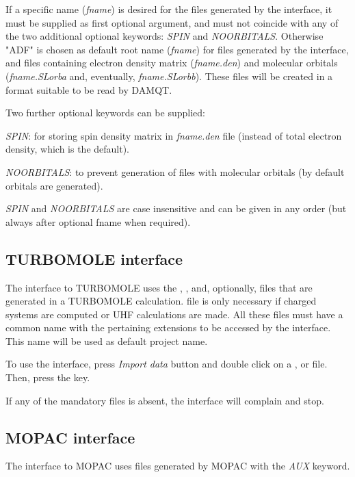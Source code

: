 \documentclass[10pt]{article}
\begin{document}
If a specific name ({\it fname}) is desired for the files generated 
by the interface, it must be supplied 
as first optional argument, and must not coincide 
with any of the two additional optional keywords: {\it SPIN} and {\it NOORBITALS}. Otherwise
"ADF" is chosen as default root name ({\it fname}) 
for files generated by the interface, and files containing electron 
density matrix ({\it fname.den}) and molecular orbitals ({\it fname.SLorba} and, 
eventually, {\it fname.SLorbb}). These files will be created in a format suitable to be 
read by DAMQT.

Two further optional keywords can be supplied:

{\it SPIN}: for storing spin density matrix in {\it fname.den} file (instead of 
total electron density, which is the default).

{\it NOORBITALS}: to prevent generation of files with molecular orbitals (by 
default orbitals are generated).

{\it SPIN} and {\it NOORBITALS} are case insensitive and can be given in any order 
(but always after optional fname when required).

\subsection{TURBOMOLE interface \label{sec:5.4}}

The interface to TURBOMOLE uses the \basis{ }, \mos{ }, \coords{ } and,
optionally, \control{ } files that are generated in a TURBOMOLE calculation.
\control{ } file is only necessary if charged systems are computed or UHF
calculations are made. All these files must have a common name with the pertaining 
extensions to be accessed by the interface. This name will be used as default project name.

To use the interface, press {\it Import data} button \teclapuntos and double click
on a \basis{ }, \mos{ } or \coords{ } file. Then, press the \exec key.

If any of the mandatory files is absent, the interface will complain and stop.

\subsection{MOPAC interface \label{sec:5.5}}

The interface to MOPAC uses \aux{ } files generated by MOPAC with the {\it AUX}
keyword.
\end{document}
